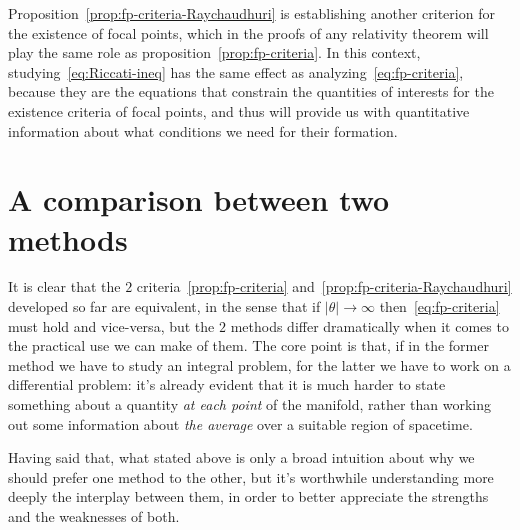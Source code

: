	Proposition~\ref{prop:fp-criteria-Raychaudhuri} is establishing another criterion for the existence of focal points, which in the proofs of any relativity theorem will play the same role as proposition~\ref{prop:fp-criteria}. In this context, studying~\ref{eq:Riccati-ineq} has the same effect as analyzing~\ref{eq:fp-criteria}, because they are the equations that constrain the quantities of interests for the existence criteria of focal points, and thus will provide us with quantitative information about what conditions we need for their formation.
	
	\section{A comparison between two methods}
	\label{sec:comparison-2-methods}
	It is clear that the \(2\) criteria~\ref{prop:fp-criteria} and~\ref{prop:fp-criteria-Raychaudhuri} developed so far are equivalent, in the sense that if \(\vert\theta\vert \rightarrow \infty\) then~\eqref{eq:fp-criteria} must hold and vice-versa, but the \(2\) methods differ dramatically when it comes to the practical use we can make of them. The core point is that, if in the former method we have to study an integral problem, for the latter we have to work on a differential problem: it's already evident that it is much harder to state something about a quantity \emph{at each point} of the manifold, rather than working out some information about \emph{the average} over a suitable region of spacetime.
	
	Having said that, what stated above is only a broad intuition about why we should prefer one method to the other, but it's worthwhile understanding more deeply the interplay between them, in order to better appreciate the strengths and the weaknesses of both.
	
